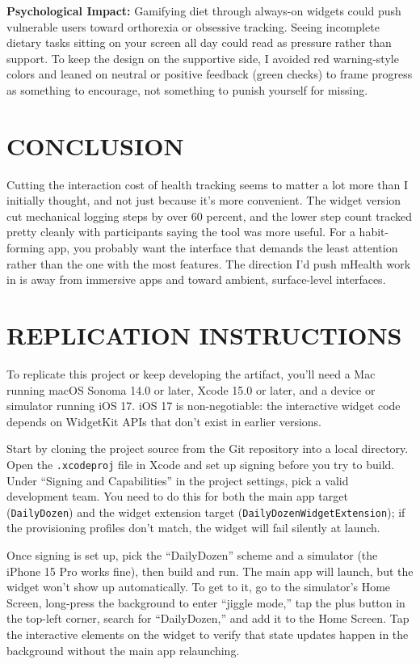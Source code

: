 \documentclass[10pt,twocolumn]{article}
\begin{document}
\noindent\textbf{Psychological Impact:} Gamifying diet through always-on widgets could push vulnerable users toward orthorexia or obsessive tracking.\cite{HayesSirensCall} Seeing incomplete dietary tasks sitting on your screen all day could read as pressure rather than support. To keep the design on the supportive side, I avoided red warning-style colors and leaned on neutral or positive feedback (green checks) to frame progress as something to encourage, not something to punish yourself for missing.

\section{CONCLUSION}

Cutting the interaction cost of health tracking seems to matter a lot more than I initially thought, and not just because it's more convenient. The widget version cut mechanical logging steps by over 60 percent, and the lower step count tracked pretty cleanly with participants saying the tool was more useful. For a habit-forming app, you probably want the interface that demands the least attention rather than the one with the most features. The direction I'd push mHealth work in is away from immersive apps and toward ambient, surface-level interfaces.

\section{REPLICATION INSTRUCTIONS}

To replicate this project or keep developing the artifact, you'll need a Mac running macOS Sonoma 14.0 or later, Xcode 15.0 or later, and a device or simulator running iOS 17. iOS 17 is non-negotiable: the interactive widget code depends on WidgetKit APIs that don't exist in earlier versions.

Start by cloning the project source from the Git repository into a local directory. Open the \texttt{.xcodeproj} file in Xcode and set up signing before you try to build. Under ``Signing and Capabilities'' in the project settings, pick a valid development team. You need to do this for both the main app target (\texttt{DailyDozen}) and the widget extension target (\texttt{DailyDozenWidgetExtension}); if the provisioning profiles don't match, the widget will fail silently at launch.

Once signing is set up, pick the ``DailyDozen'' scheme and a simulator (the iPhone 15 Pro works fine), then build and run. The main app will launch, but the widget won't show up automatically. To get to it, go to the simulator's Home Screen, long-press the background to enter ``jiggle mode,'' tap the plus button in the top-left corner, search for ``DailyDozen,'' and add it to the Home Screen. Tap the interactive elements on the widget to verify that state updates happen in the background without the main app relaunching.
\end{document}
